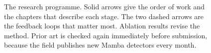 \begin{figure}[htbp]

\vspace{2mm}
\caption[The research programme and its feedback loops]{The research
programme. Solid arrows give the order of work and the chapters that
describe each stage. The two dashed arrows are the feedback loops that
matter most. Ablation results revise the method. Prior art is checked again
immediately before submission, because the field publishes new Mamba
detectors every month.}
\label{fig:programme}
\end{figure}
